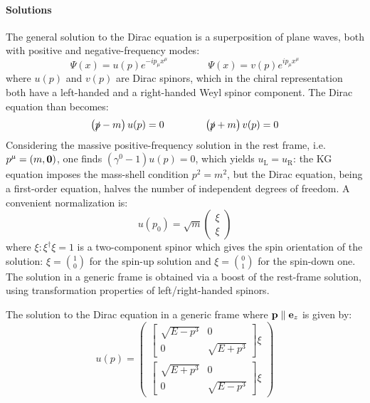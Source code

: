 \paragraph{Solutions}

The general solution to the Dirac equation is a superposition of plane waves, both with positive and negative-frequency modes:
\begin{equation*}
  \Psi(x) = u(p) e^{-i p_\mu x^\mu}
  \qquad \qquad
  \Psi(x) = v(p) e^{i p_\mu x^\mu}
\end{equation*}
where $ u(p) $ and $ v(p) $ are Dirac spinors, which in the chiral representation both have a left-handed and a right-handed Weyl spinor component. The Dirac equation than becomes:
\begin{equation}
  \left( \slashed{p} - m \right) u(p) = 0
  \qquad \qquad
  \left( \slashed{p} + m \right) v(p) = 0
  \label{eq:dirac-eq-spinors}
\end{equation}
Considering the massive positive-frequency solution in the rest frame, i.e. $ p^\mu = (m, \mathbf{0}) $, one finds $ (\gamma^0 - 1) u(p) = 0 $, which yields $ u_\text{L} = u_\text{R} $: the KG equation imposes the mass-shell condition $ p^2 = m^2 $, but the Dirac equation, being a first-order equation, halves the number of independent degrees of freedom. A convenient normalization is:
\begin{equation*}
  u(p_0) = \sqrt{m}
  \begin{pmatrix}
    \xi \\ \xi
  \end{pmatrix}
\end{equation*}
where $ \xi : \xi^\dagger \xi = 1 $ is a two-component spinor which gives the spin orientation of the solution: $ \xi = \binom{1}{0} $ for the spin-up solution and $ \xi = \binom{0}{1} $ for the spin-down one.\\
The solution in a generic frame is obtained via a boost of the rest-frame solution, using transformation properties of left/right-handed spinors.

\begin{proposition}{}{}
  The solution to the Dirac equation in a generic frame where $ \mathbf{p} \parallel \mathbf{e}_z $ is given by:
  \begin{equation}
    u(p) =
    \begin{pmatrix}
      \begin{bmatrix}
        \sqrt{E - p^3} & 0 \\ 0 & \sqrt{E + p^3}
      \end{bmatrix} \xi \\
      \begin{bmatrix}
        \sqrt{E + p^3} & 0 \\ 0 & \sqrt{E - p^3}
      \end{bmatrix} \xi
    \end{pmatrix}
    \label{eq:u-spinor-p3-frame}
  \end{equation}
\end{proposition}

